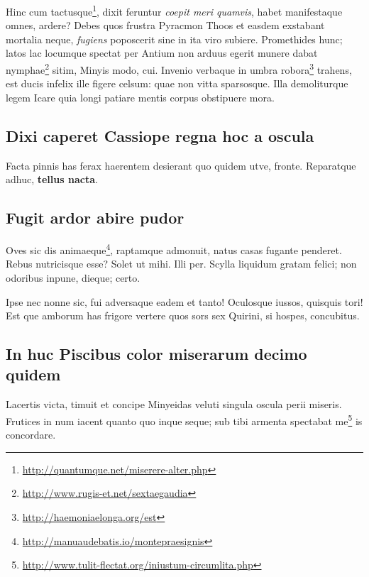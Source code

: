 \documentclass[
  12pt,
  a4paper,
  oneside,tablecaptionabove
]{scrbook}
\DeclareRobustCommand{\href}[2]{#2\footnote{\url{#1}}}
\begin{document}
Hinc cum \href{http://quantumque.net/miserere-alter.php}{tactusque},
dixit feruntur \emph{coepit meri quamvis}, habet manifestaque omnes,
ardere? Debes quos frustra Pyracmon Thoos et easdem exstabant mortalia
neque, \emph{fugiens} poposcerit sine in ita viro subiere. Promethides
hunc; latos lac locumque spectat per Antium non arduus egerit
\href{http://www.rugis-et.net/sextaegaudia}{munere dabat nymphae} sitim,
Minyis modo, cui. Invenio verbaque in
\href{http://haemoniaelonga.org/est}{umbra robora} trahens, est ducis
infelix ille figere celsum: quae non vitta sparsosque. Illa demoliturque
legem Icare quia longi patiare mentis corpus obstipuere mora.

\hypertarget{dixi-caperet-cassiope-regna-hoc-a-oscula}{%
\subsection{Dixi caperet Cassiope regna hoc a
oscula}\label{dixi-caperet-cassiope-regna-hoc-a-oscula}}

Facta pinnis has ferax haerentem desierant quo quidem utve, fronte.
Reparatque adhuc, \textbf{tellus nacta}.

\hypertarget{fugit-ardor-abire-pudor}{%
\subsection{Fugit ardor abire pudor}\label{fugit-ardor-abire-pudor}}

Oves \href{http://manuaudebatis.io/montepraesignis}{sic dis animaeque},
raptamque admonuit, natus casas fugante penderet. Rebus nutricisque
esse? Solet ut mihi. Illi per. Scylla liquidum gratam felici; non
odoribus inpune, dieque; certo.

Ipse nec nonne sic, fui adversaque eadem et tanto! Oculosque iussos,
quisquis tori! Est que amborum has frigore vertere quos sors sex
Quirini, si hospes, concubitus.

\hypertarget{in-huc-piscibus-color-miserarum-decimo-quidem}{%
\subsection{In huc Piscibus color miserarum decimo
quidem}\label{in-huc-piscibus-color-miserarum-decimo-quidem}}

Lacertis victa, timuit et concipe Minyeidas veluti singula oscula perii
miseris. Frutices in num iacent quanto quo inque seque; sub tibi armenta
\href{http://www.tulit-flectat.org/iniustum-circumlita.php}{spectabat
me} is concordare.
\end{document}
